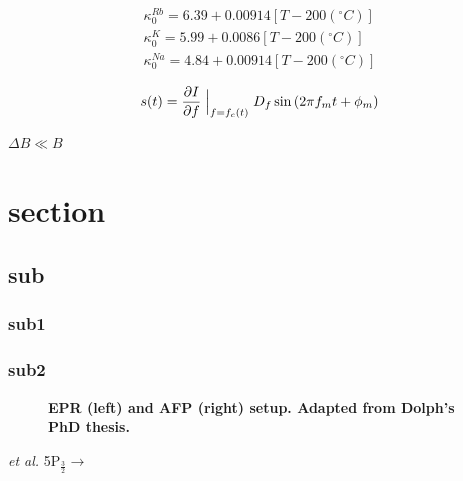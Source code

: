 \documentclass[pdftex,letterpaper,12pt]{report}
\begin{document}
	
\begin{subequations}
	\begin{gather}
	\kappa_{0}^{Rb}=6.39+0.00914[T-200(^{\circ}C)]\\
	\kappa_{0}^{K}=5.99+0.0086[T-200(^{\circ}C)]\\
	\kappa_{0}^{Na}=4.84+0.00914[T-200(^{\circ}C)]
	\end{gather}
\end{subequations}

\begin{equation}
s(t)=\frac{\partial I}{\partial f}\Bigm|_{f=f_{c}(t)}D_{f}\sin{\left(2\pi f_{m}t+\phi_{m}\right)}
\end{equation}

$\Delta B \ll B$

\section{section}
\subsection{sub}
\subsubsection{sub1}
\subsubsection{sub2}

\begin{figure}[H]
	\centering
	\caption{{\bf EPR (left) and AFP (right) setup. Adapted from Dolph's PhD thesis.}}
	\label{AFPandEPRsetup}
\end{figure}

\emph{et al.}
5P$_{\frac{3}{2}}\rightarrow$


\end{document}
